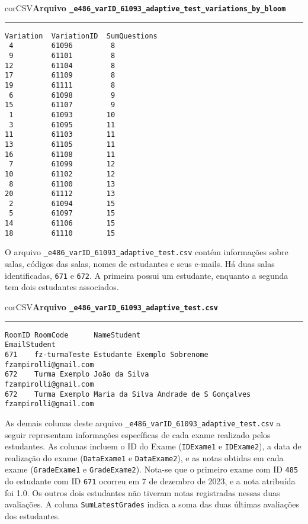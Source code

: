 \begin{myboxCode}{corCSV}{\textbf{Arquivo \texttt{\_e486\_varID\_61093\_adaptive\_test\_variations\_by\_bloom}}}\vspace{3mm}
\hrule
\begin{verbatim}
Variation  VariationID  SumQuestions
 4         61096         8
 9         61101         8
12         61104         8
17         61109         8
19         61111         8
 6         61098         9
15         61107         9
 1         61093        10
 3         61095        11
11         61103        11
13         61105        11
16         61108        11
 7         61099        12
10         61102        12
 8         61100        13
20         61112        13
 2         61094        15
 5         61097        15
14         61106        15
18         61110        15
\end{verbatim}
\end{myboxCode}



O arquivo \verb|_e486_varID_61093_adaptive_test.csv| contém informações sobre salas, códigos das salas, nomes de estudantes e seus e-mails. Há duas salas identificadas, \verb|671| e \verb|672|. A primeira possui um estudante, enquanto a segunda tem dois estudantes associados.

\begin{myboxCode}{corCSV}{\textbf{Arquivo \texttt{\_e486\_varID\_61093\_adaptive\_test.csv}}}\vspace{3mm}
\hrule
\begin{verbatim}
RoomID RoomCode      NameStudent                           EmailStudent
671    fz-turmaTeste Estudante Exemplo Sobrenome           fzampirolli@gmail.com 
672    Turma Exemplo João da Silva                         fzampirolli@gmail.com 
672    Turma Exemplo Maria da Silva Andrade de S Gonçalves fzampirolli@gmail.com    
\end{verbatim}
\end{myboxCode}

As demais colunas deste arquivo \verb|_e486_varID_61093_adaptive_test.csv| a seguir representam informações específicas de cada exame realizado pelos estudantes. As colunas incluem o ID do Exame (\verb|IDExame1| e \verb|IDExame2|), a data de realização do exame (\verb|DataExame1| e \verb|DataExame2|), e as notas obtidas em cada exame (\verb|GradeExame1| e \verb|GradeExame2|). Nota-se que o primeiro exame com ID \verb|485| do estudante com ID \verb|671| ocorreu em 7 de dezembro de 2023, e a nota atribuída foi 1.0. Os outros dois estudantes não tiveram notas registradas nessas duas avaliações. A coluna \verb|SumLatestGrades| indica a soma das duas últimas avaliações dos estudantes.

